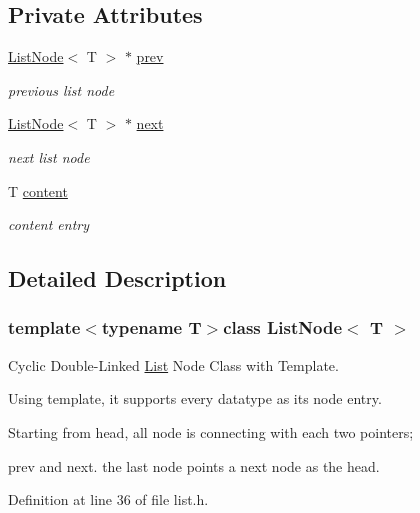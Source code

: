 \subsection*{Private Attributes}
\begin{DoxyCompactItemize}
\item 
\hyperlink{class_list_node}{List\-Node}$<$ T $>$ $\ast$ \hyperlink{class_list_node_a997ca532d810ebd030726ff880ba76b5}{prev}
\begin{DoxyCompactList}\small\item\em previous list node \end{DoxyCompactList}\item 
\hyperlink{class_list_node}{List\-Node}$<$ T $>$ $\ast$ \hyperlink{class_list_node_a97909c9598053ffd24b77ec715f745f1}{next}
\begin{DoxyCompactList}\small\item\em next list node \end{DoxyCompactList}\item 
T \hyperlink{class_list_node_a75aabe0bfbeace74391ab20546454e05}{content}
\begin{DoxyCompactList}\small\item\em content entry \end{DoxyCompactList}\end{DoxyCompactItemize}


\subsection{Detailed Description}
\subsubsection*{template$<$typename T$>$class List\-Node$<$ T $>$}

Cyclic Double-\/\-Linked \hyperlink{class_list}{List} Node Class with Template. 

Using template, it supports every datatype as its node entry. \par
 Starting from head, all node is connecting with each two pointers; \par
 prev and next. the last node points a next node as the head. 

Definition at line 36 of file list.\-h.



